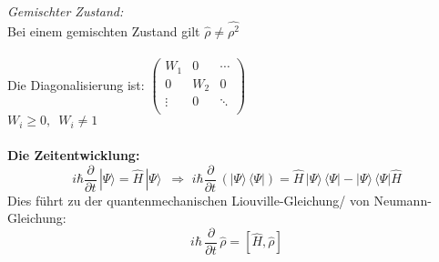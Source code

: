 \documentclass[a4paper,11pt]{scrartcl}
\begin{document}
\\
\\
\textit{Gemischter Zustand:} \\
Bei einem gemischten Zustand gilt $\hat{\rho} \neq \hat{\rho^2}$ \\
\\
Die Diagonalisierung ist: 
$\left( \begin{array}{rrr}
W_1 & 0 & \cdots \\
0 & W_2 & 0  \\
\vdots & 0 & \ddots  \\
\end{array}\right) $\\

$W_i \geq 0, \,\,\, W_i \neq 1$ \\
\\
\textbf{Die Zeitentwicklung:}\\
\begin{equation}
 i \hbar \frac{\partial }{\partial t } \, | \Psi \rangle = \hat{H} \, | \Psi \rangle \,\,\, \Rightarrow \,\, i \hbar \frac{\partial }{\partial t } \, ( | \Psi \rangle \, \langle \Psi | )  = \hat{H} \, | \Psi \rangle \, \langle \Psi | - | \Psi \rangle \,\langle \Psi | \hat{H}  
\end{equation}
Dies führt zu der quantenmechanischen Liouville-Gleichung/ von Neumann-Gleichung: 
\begin{equation}
 i \hbar \, \frac{\partial}{\partial t} \, \hat{\rho} = \left[ \hat{H}, \hat{\rho} \right]
\end{equation}
\end{document}
